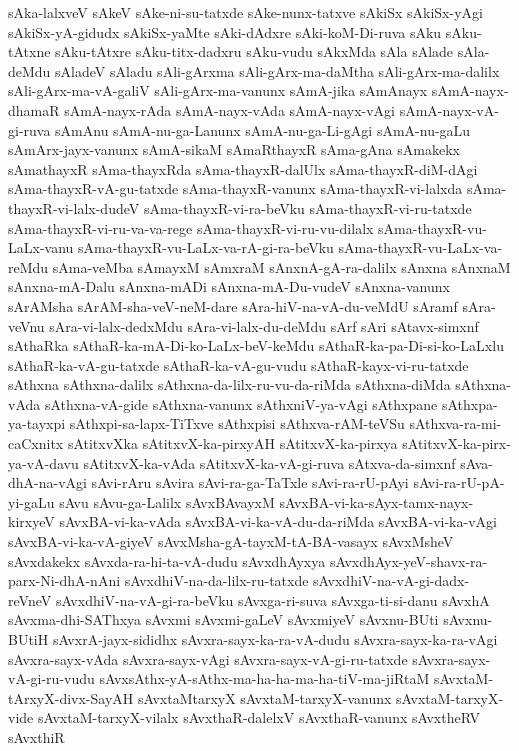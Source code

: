 {sAka-lalxveV
sAkeV
sAke-ni-su-tatxde
sAke-nunx-tatxve
sAkiSx
sAkiSx-yAgi
sAkiSx-yA-gidudx
sAkiSx-yaMte
sAki-dAdxre
sAki-koM-Di-ruva
sAku
sAku-tAtxne
sAku-tAtxre
sAku-titx-dadxru
sAku-vudu
sAkxMda
sAla
sAlade
sAla-deMdu
sAladeV
sAladu
sAli-gArxma
sAli-gArx-ma-daMtha
sAli-gArx-ma-dalilx
sAli-gArx-ma-vA-galiV
sAli-gArx-ma-vanunx
sAmA-jika
sAmAnayx
sAmA-nayx-dhamaR
sAmA-nayx-rAda
sAmA-nayx-vAda
sAmA-nayx-vAgi
sAmA-nayx-vA-gi-ruva
sAmAnu
sAmA-nu-ga-Lanunx
sAmA-nu-ga-Li-gAgi
sAmA-nu-gaLu
sAmArx-jayx-vanunx
sAmA-sikaM
sAmaRthayxR
sAma-gAna
sAmakekx
sAmathayxR
sAma-thayxRda
sAma-thayxR-dalUlx
sAma-thayxR-diM-dAgi
sAma-thayxR-vA-gu-tatxde
sAma-thayxR-vanunx
sAma-thayxR-vi-lalxda
sAma-thayxR-vi-lalx-dudeV
sAma-thayxR-vi-ra-beVku
sAma-thayxR-vi-ru-tatxde
sAma-thayxR-vi-ru-va-va-rege
sAma-thayxR-vi-ru-vu-dilalx
sAma-thayxR-vu-LaLx-vanu
sAma-thayxR-vu-LaLx-va-rA-gi-ra-beVku
sAma-thayxR-vu-LaLx-va-reMdu
sAma-veMba
sAmayxM
sAmxraM
sAnxnA-gA-ra-dalilx
sAnxna
sAnxnaM
sAnxna-mA-Dalu
sAnxna-mADi
sAnxna-mA-Du-vudeV
sAnxna-vanunx
sArAMsha
sArAM-sha-veV-neM-dare
sAra-hiV-na-vA-du-veMdU
sAramf
sAra-veVnu
sAra-vi-lalx-dedxMdu
sAra-vi-lalx-du-deMdu
sArf
sAri
sAtavx-simxnf
sAthaRka
sAthaR-ka-mA-Di-ko-LaLx-beV-keMdu
sAthaR-ka-pa-Di-si-ko-LaLxlu
sAthaR-ka-vA-gu-tatxde
sAthaR-ka-vA-gu-vudu
sAthaR-kayx-vi-ru-tatxde
sAthxna
sAthxna-dalilx
sAthxna-da-lilx-ru-vu-da-riMda
sAthxna-diMda
sAthxna-vAda
sAthxna-vA-gide
sAthxna-vanunx
sAthxniV-ya-vAgi
sAthxpane
sAthxpa-ya-tayxpi
sAthxpi-sa-lapx-TiTxve
sAthxpisi
sAthxva-rAM-teVSu
sAthxva-ra-mi-caCxnitx
sAtitxvXka
sAtitxvX-ka-pirxyAH
sAtitxvX-ka-pirxya
sAtitxvX-ka-pirx-ya-vA-davu
sAtitxvX-ka-vAda
sAtitxvX-ka-vA-gi-ruva
sAtxva-da-simxnf
sAva-dhA-na-vAgi
sAvi-rAru
sAvira
sAvi-ra-ga-TaTxle
sAvi-ra-rU-pAyi
sAvi-ra-rU-pA-yi-gaLu
sAvu
sAvu-ga-Lalilx
sAvxBAvayxM
sAvxBA-vi-ka-sAyx-tamx-nayx-kirxyeV
sAvxBA-vi-ka-vAda
sAvxBA-vi-ka-vA-du-da-riMda
sAvxBA-vi-ka-vAgi
sAvxBA-vi-ka-vA-giyeV
sAvxMsha-gA-tayxM-tA-BA-vasayx
sAvxMsheV
sAvxdakekx
sAvxda-ra-hi-ta-vA-dudu
sAvxdhAyxya
sAvxdhAyx-yeV-shavx-ra-parx-Ni-dhA-nAni
sAvxdhiV-na-da-lilx-ru-tatxde
sAvxdhiV-na-vA-gi-dadx-reVneV
sAvxdhiV-na-vA-gi-ra-beVku
sAvxga-ri-suva
sAvxga-ti-si-danu
sAvxhA
sAvxma-dhi-SAThxya
sAvxmi
sAvxmi-gaLeV
sAvxmiyeV
sAvxnu-BUti
sAvxnu-BUtiH
sAvxrA-jayx-sididhx
sAvxra-sayx-ka-ra-vA-dudu
sAvxra-sayx-ka-ra-vAgi
sAvxra-sayx-vAda
sAvxra-sayx-vAgi
sAvxra-sayx-vA-gi-ru-tatxde
sAvxra-sayx-vA-gi-ru-vudu
sAvxsAthx-yA-sAthx-ma-ha-ha-ma-ha-tiV-ma-jiRtaM
sAvxtaM-tArxyX-divx-SayAH
sAvxtaMtarxyX
sAvxtaM-tarxyX-vanunx
sAvxtaM-tarxyX-vide
sAvxtaM-tarxyX-vilalx
sAvxthaR-dalelxV
sAvxthaR-vanunx
sAvxtheRV
sAvxthiR
}
